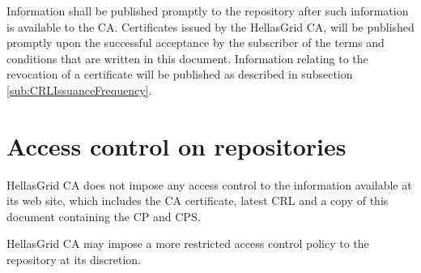 Information shall be published promptly to the repository after such information is available to the CA. Certificates issued by the HellasGrid CA, will be published promptly upon the successful acceptance by the subscriber of the terms and conditions that are written in this document. Information relating to the revocation of a certificate will be published as described in subsection \ref{sub:CRLIssuanceFrequency}.


\section{Access control on repositories}

HellasGrid CA does not impose any access control to the information available at its web site, which includes the CA certificate, latest CRL and a copy of this document containing the CP and CPS.

HellasGrid CA may impose a more restricted access control policy to the repository at its discretion.


